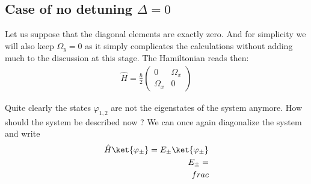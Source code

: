 \subsection{Case of no detuning $\Delta = 0$}

Let us suppose that the diagonal elements are exactly zero. And for simplicity we will also keep $\Omega_y =0$ as it simply complicates the calculations without adding much to the discussion at this stage. The Hamiltonian reads then:
\begin{align}
\hat{H} = \frac{\hbar}{2}\left( \begin{array}{cc} 0  & \Omega_x\\ \Omega_x &0 \end{array} \right)
\end{align}

Quite clearly the states $\varphi_{1,2}$ are not the eigenstates of the system anymore. How should the system be described now ? We can once again diagonalize the system and write
\begin{align}
\hat{H}\ket{\varphi_{\pm}} = E_{\pm}\ket{\varphi_\pm}\\
E_{\pm} = \\frac{}
\end{align}
